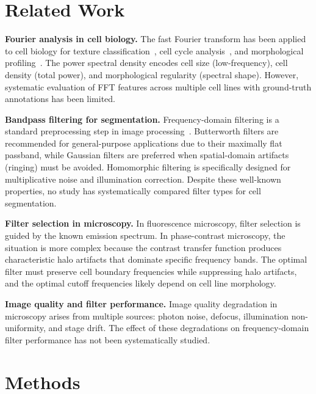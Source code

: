 \documentclass[11pt,a4paper]{article}
\begin{document}
\section{Related Work}
\label{sec:related}

\textbf{Fourier analysis in cell biology.} The fast Fourier transform has been applied to cell biology for texture classification~\cite{castleman1979}, cell cycle analysis~\cite{lloyd1993}, and morphological profiling~\cite{bray2012}. The power spectral density encodes cell size (low-frequency), cell density (total power), and morphological regularity (spectral shape). However, systematic evaluation of FFT features across multiple cell lines with ground-truth annotations has been limited.

\textbf{Bandpass filtering for segmentation.} Frequency-domain filtering is a standard preprocessing step in image processing~\cite{gonzalez2018digital}. Butterworth filters are recommended for general-purpose applications due to their maximally flat passband, while Gaussian filters are preferred when spatial-domain artifacts (ringing) must be avoided. Homomorphic filtering is specifically designed for multiplicative noise and illumination correction. Despite these well-known properties, no study has systematically compared filter types for cell segmentation.

\textbf{Filter selection in microscopy.} In fluorescence microscopy, filter selection is guided by the known emission spectrum. In phase-contrast microscopy, the situation is more complex because the contrast transfer function produces characteristic halo artifacts that dominate specific frequency bands. The optimal filter must preserve cell boundary frequencies while suppressing halo artifacts, and the optimal cutoff frequencies likely depend on cell line morphology.

\textbf{Image quality and filter performance.} Image quality degradation in microscopy arises from multiple sources: photon noise, defocus, illumination non-uniformity, and stage drift. The effect of these degradations on frequency-domain filter performance has not been systematically studied.

\section{Methods}
\label{sec:methods}
\end{document}
